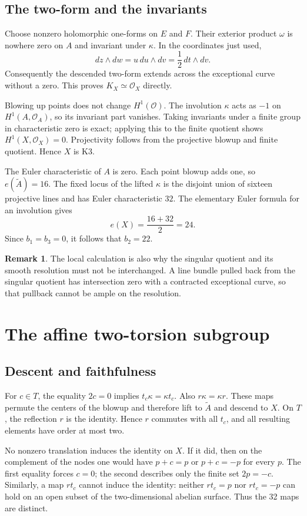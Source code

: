 \documentclass[11pt]{amsart}
\theoremstyle{definition}
\newtheorem{remark}[theorem]{Remark}
\begin{document}
\subsection{The two-form and the invariants}
Choose nonzero holomorphic one-forms on $E$ and $F$. Their exterior
product $\omega$ is nowhere zero on $A$ and invariant under $\kappa$.
In the coordinates just used,
\[
 dz\wedge dw=u\,du\wedge dv=\frac12\,dt\wedge dv.
\]
Consequently the descended two-form extends across the exceptional
curve without a zero. This proves $K_X\simeq\mathcal O_X$ directly.

Blowing up points does not change $H^1(\mathcal O)$. The involution
$\kappa$ acts as $-1$ on $H^1(A,\mathcal O_A)$, so its invariant part
vanishes. Taking invariants under a finite group in characteristic zero
is exact; applying this to the finite quotient shows
$H^1(X,\mathcal O_X)=0$. Projectivity follows from the projective
blowup and finite quotient. Hence $X$ is K3.

The Euler characteristic of $A$ is zero. Each point blowup adds one, so
$e(\widetilde A)=16$. The fixed locus of the lifted $\kappa$ is the
disjoint union of sixteen projective lines and has Euler characteristic
$32$. The elementary Euler formula for an involution gives
\[
 e(X)=\frac{16+32}{2}=24.
\]
Since $b_1=b_3=0$, it follows that $b_2=22$.

\begin{remark}
The local calculation is also why the singular quotient and its smooth
resolution must not be interchanged. A line bundle pulled back from the
singular quotient has intersection zero with a contracted exceptional
curve, so that pullback cannot be ample on the resolution.
\end{remark}

\section{The affine two-torsion subgroup}
\subsection{Descent and faithfulness}
For $c\in T$, the equality $2c=0$ implies $t_c\kappa=\kappa t_c$.
Also $r\kappa=\kappa r$. These maps permute the centers of the blowup
and therefore lift to $\widetilde A$ and descend to $X$.
On $T$, the reflection $r$ is the identity. Hence $r$ commutes with all
$t_c$, and all resulting elements have order at most two.

No nonzero translation induces the identity on $X$. If it did, then on
the complement of the nodes one would have $p+c=p$ or $p+c=-p$ for
every $p$. The first equality forces $c=0$; the second describes only
the finite set $2p=-c$. Similarly, a map $rt_c$ cannot induce the
identity: neither $rt_c=p$ nor $rt_c=-p$ can hold on an open subset
of the two-dimensional abelian surface. Thus the 32 maps are distinct.
\end{document}
